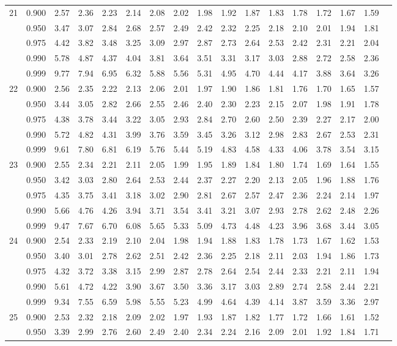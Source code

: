 \documentclass[pdftex,11pt,openany]{book}\usepackage[]{graphicx}\usepackage[]{color}
\begin{document}
{\begin{center}
\begin{tabular}{rrr@{\,}r@{\,}r@{\,}r@{\,}r@{\,}r@{\,}r@{\,}r
                   @{\,}r@{\,}r@{\,}r@{\,}r@{\,}r@{\,}r@{\,}r}
21&0.900&2.57&2.36&2.23&2.14&2.08&2.02&1.98&1.92&1.87&1.83&1.78&1.72&1.67&1.59\\
  &0.950&3.47&3.07&2.84&2.68&2.57&2.49&2.42&2.32&2.25&2.18&2.10&2.01&1.94&1.81\\
  &0.975&4.42&3.82&3.48&3.25&3.09&2.97&2.87&2.73&2.64&2.53&2.42&2.31&2.21&2.04\\
  &0.990&5.78&4.87&4.37&4.04&3.81&3.64&3.51&3.31&3.17&3.03&2.88&2.72&2.58&2.36\\
  &0.999&9.77&7.94&6.95&6.32&5.88&5.56&5.31&4.95&4.70&4.44&4.17&3.88&3.64&3.26\\
22&0.900&2.56&2.35&2.22&2.13&2.06&2.01&1.97&1.90&1.86&1.81&1.76&1.70&1.65&1.57\\
  &0.950&3.44&3.05&2.82&2.66&2.55&2.46&2.40&2.30&2.23&2.15&2.07&1.98&1.91&1.78\\
  &0.975&4.38&3.78&3.44&3.22&3.05&2.93&2.84&2.70&2.60&2.50&2.39&2.27&2.17&2.00\\
  &0.990&5.72&4.82&4.31&3.99&3.76&3.59&3.45&3.26&3.12&2.98&2.83&2.67&2.53&2.31\\
  &0.999&9.61&7.80&6.81&6.19&5.76&5.44&5.19&4.83&4.58&4.33&4.06&3.78&3.54&3.15\\
23&0.900&2.55&2.34&2.21&2.11&2.05&1.99&1.95&1.89&1.84&1.80&1.74&1.69&1.64&1.55\\
  &0.950&3.42&3.03&2.80&2.64&2.53&2.44&2.37&2.27&2.20&2.13&2.05&1.96&1.88&1.76\\
  &0.975&4.35&3.75&3.41&3.18&3.02&2.90&2.81&2.67&2.57&2.47&2.36&2.24&2.14&1.97\\
  &0.990&5.66&4.76&4.26&3.94&3.71&3.54&3.41&3.21&3.07&2.93&2.78&2.62&2.48&2.26\\
  &0.999&9.47&7.67&6.70&6.08&5.65&5.33&5.09&4.73&4.48&4.23&3.96&3.68&3.44&3.05\\
24&0.900&2.54&2.33&2.19&2.10&2.04&1.98&1.94&1.88&1.83&1.78&1.73&1.67&1.62&1.53\\
  &0.950&3.40&3.01&2.78&2.62&2.51&2.42&2.36&2.25&2.18&2.11&2.03&1.94&1.86&1.73\\
  &0.975&4.32&3.72&3.38&3.15&2.99&2.87&2.78&2.64&2.54&2.44&2.33&2.21&2.11&1.94\\
  &0.990&5.61&4.72&4.22&3.90&3.67&3.50&3.36&3.17&3.03&2.89&2.74&2.58&2.44&2.21\\
  &0.999&9.34&7.55&6.59&5.98&5.55&5.23&4.99&4.64&4.39&4.14&3.87&3.59&3.36&2.97\\
25&0.900&2.53&2.32&2.18&2.09&2.02&1.97&1.93&1.87&1.82&1.77&1.72&1.66&1.61&1.52\\
  &0.950&3.39&2.99&2.76&2.60&2.49&2.40&2.34&2.24&2.16&2.09&2.01&1.92&1.84&1.71\\

\end{tabular}
\end{center}}
\end{document}
